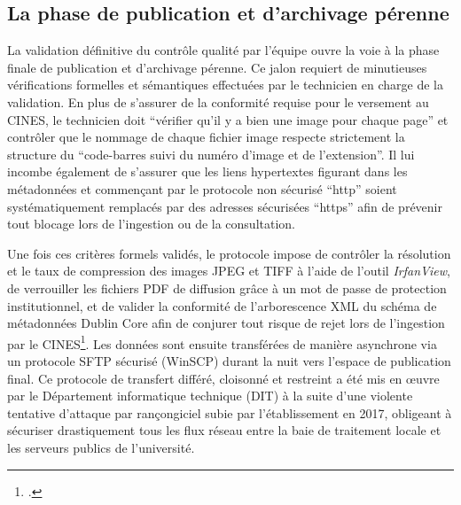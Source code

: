 \subsection{La phase de publication et d'archivage pérenne}
La validation définitive du contrôle qualité par l'équipe ouvre la voie à la phase finale de publication et d'archivage pérenne. Ce jalon requiert de minutieuses vérifications formelles et sémantiques effectuées par le technicien en charge de la validation. En plus de s'assurer de la conformité requise pour le versement au \ac{CINES}, le technicien doit \enquote{vérifier qu'il y a bien une image pour chaque page} et contrôler que le nommage de chaque fichier image respecte strictement la structure du \enquote{code-barres suivi du numéro d'image et de l'extension}. Il lui incombe également de s'assurer que les liens hypertextes figurant dans les métadonnées et commençant par le protocole non sécurisé \enquote{http} soient systématiquement remplacés par des adresses sécurisées \enquote{https} afin de prévenir tout blocage lors de l'ingestion ou de la consultation. 

Une fois ces critères formels validés, le protocole impose de contrôler la résolution et le taux de compression des images \ac{JPEG} et \ac{TIFF} à l'aide de l'outil \textit{IrfanView}, de verrouiller les fichiers \ac{PDF} de diffusion grâce à un mot de passe de protection institutionnel, et de valider la conformité de l'arborescence \ac{XML} du schéma de métadonnées Dublin Core afin de conjurer tout risque de rejet lors de l'ingestion par le \ac{CINES}\footcite{2010CRArchivage}. Les données sont ensuite transférées de manière asynchrone via un protocole \ac{SFTP} sécurisé (WinSCP) durant la nuit vers l'espace de publication final. Ce protocole de transfert différé, cloisonné et restreint a été mis en œuvre par le Département informatique technique (\ac{DIT}) à la suite d'une violente tentative d'attaque par rançongiciel subie par l'établissement en 2017, obligeant à sécuriser drastiquement tous les flux réseau entre la baie de traitement locale et les serveurs publics de l'université.

